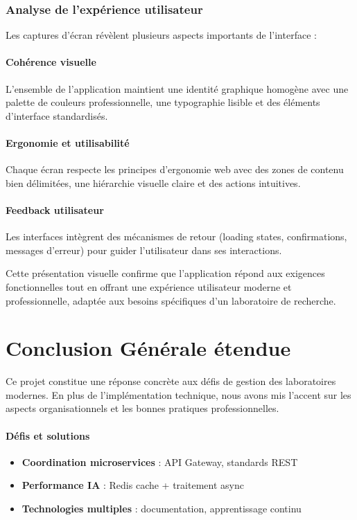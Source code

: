 \documentclass{rapportPfe}
\begin{document}
\subsubsection{Analyse de l'expérience utilisateur}

Les captures d'écran révèlent plusieurs aspects importants de l'interface :

\paragraph{Cohérence visuelle}
L'ensemble de l'application maintient une identité graphique homogène avec une palette de couleurs professionnelle, une typographie lisible et des éléments d'interface standardisés.

\paragraph{Ergonomie et utilisabilité}
Chaque écran respecte les principes d'ergonomie web avec des zones de contenu bien délimitées, une hiérarchie visuelle claire et des actions intuitives.

\paragraph{Feedback utilisateur}
Les interfaces intègrent des mécanismes de retour (loading states, confirmations, messages d'erreur) pour guider l'utilisateur dans ses interactions.

Cette présentation visuelle confirme que l'application répond aux exigences fonctionnelles tout en offrant une expérience utilisateur moderne et professionnelle, adaptée aux besoins spécifiques d'un laboratoire de recherche.

\newpage
\section{Conclusion Générale étendue}
Ce projet constitue une réponse concrète aux défis de gestion des laboratoires modernes. En plus de l'implémentation technique, nous avons mis l'accent sur les aspects organisationnels et les bonnes pratiques professionnelles.

\paragraph{Défis et solutions}
\begin{itemize}
    \item \textbf{Coordination microservices} : API Gateway, standards REST
    \item \textbf{Performance IA} : Redis cache + traitement async
    \item \textbf{Technologies multiples} : documentation, apprentissage continu
\end{itemize}
\end{document}
